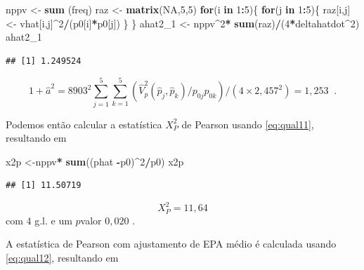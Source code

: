 \documentclass[]{book}
\newenvironment{Shaded}{\begin{snugshade}}{\end{snugshade}}
\newcommand{\KeywordTok}[1]{\textcolor[rgb]{0.13,0.29,0.53}{\textbf{#1}}}
\newcommand{\DecValTok}[1]{\textcolor[rgb]{0.00,0.00,0.81}{#1}}
\newcommand{\StringTok}[1]{\textcolor[rgb]{0.31,0.60,0.02}{#1}}
\newcommand{\OtherTok}[1]{\textcolor[rgb]{0.56,0.35,0.01}{#1}}
\newcommand{\ControlFlowTok}[1]{\textcolor[rgb]{0.13,0.29,0.53}{\textbf{#1}}}
\newcommand{\OperatorTok}[1]{\textcolor[rgb]{0.81,0.36,0.00}{\textbf{#1}}}
\newcommand{\NormalTok}[1]{#1}
\theoremstyle{definition}
\theoremstyle{definition}
\theoremstyle{definition}
\theoremstyle{remark}
\begin{document}
\begin{Shaded}
\begin{Highlighting}[]
\NormalTok{nppv <-}\StringTok{ }\KeywordTok{sum}\NormalTok{ (freq)}
\NormalTok{raz <-}\StringTok{ }\KeywordTok{matrix}\NormalTok{(}\OtherTok{NA}\NormalTok{,}\DecValTok{5}\NormalTok{,}\DecValTok{5}\NormalTok{)}
\ControlFlowTok{for}\NormalTok{(i }\ControlFlowTok{in} \DecValTok{1}\OperatorTok{:}\DecValTok{5}\NormalTok{)\{}
  \ControlFlowTok{for}\NormalTok{(j }\ControlFlowTok{in} \DecValTok{1}\OperatorTok{:}\DecValTok{5}\NormalTok{)\{}
\NormalTok{    raz[i,j]<-}\StringTok{ }\NormalTok{vhat[i,j]}\OperatorTok{^}\DecValTok{2}\OperatorTok{/}\NormalTok{(p0[i]}\OperatorTok{*}\NormalTok{p0[j])}
\NormalTok{  \}}
\NormalTok{\}}
\NormalTok{ahat2_}\DecValTok{1}\NormalTok{ <-}\StringTok{ }\NormalTok{nppv}\OperatorTok{^}\DecValTok{2}\OperatorTok{*}\StringTok{ }\KeywordTok{sum}\NormalTok{(raz)}\OperatorTok{/}\NormalTok{(}\DecValTok{4}\OperatorTok{*}\NormalTok{deltahatdot}\OperatorTok{^}\DecValTok{2}\NormalTok{)}
\NormalTok{ahat2_}\DecValTok{1}
\end{Highlighting}
\end{Shaded}

\begin{verbatim}
## [1] 1.249524
\end{verbatim}

\[
1+\hat{a}^{2}=8903^{2}\sum\limits_{j=1}^{5}\sum\limits_{k=1}^{5}\left( \hat{V}_{p}^{2}\left( \hat{p}_{j},\hat{p}_{k}\right) /p_{0j}p_{0k}\right) /\left(
4\times 2,457^{2}\right) =1,253\;\;. 
\]

Podemos então calcular a estatística \(X_{P}^{2}\) de Pearson usando
\eqref{eq:qual11}, resultando em

\begin{Shaded}
\begin{Highlighting}[]
\NormalTok{x2p <-nppv}\OperatorTok{*}\StringTok{ }\KeywordTok{sum}\NormalTok{((phat }\OperatorTok{-}\NormalTok{p0)}\OperatorTok{^}\DecValTok{2}\OperatorTok{/}\NormalTok{p0)}
\NormalTok{x2p}
\end{Highlighting}
\end{Shaded}

\begin{verbatim}
## [1] 11.50719
\end{verbatim}

\[
X_{P}^{2}=11,64 
\] com \(4\) g.l. e um \(p\)valor \(0,020\) .

A estatística de Pearson com ajustamento de EPA médio é calculada usando
\eqref{eq:qual12}, resultando em
\end{document}
